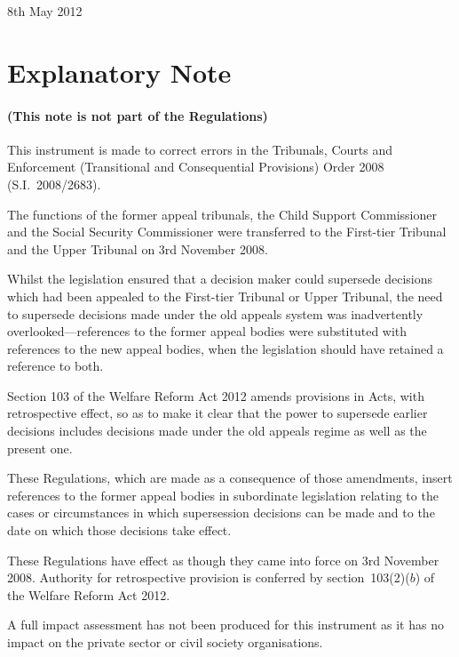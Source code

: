 \documentclass[12pt,a4paper]{article}
\begin{document}
8th May 2012

\small

\part{Explanatory Note}

\renewcommand\parthead{— Explanatory Note}

\subsection*{(This note is not part of the Regulations)}

This instrument is made to correct errors in the Tribunals, Courts and Enforcement (Transitional and Consequential Provisions) Order 2008 (S.I.~2008/2683).

The functions of the former appeal tribunals, the Child Support Commissioner and the Social Security Commissioner were transferred to the First-tier Tribunal and the Upper Tribunal on 3rd November 2008.

Whilst the legislation ensured that a decision maker could supersede decisions which had been appealed to the First-tier Tribunal or Upper Tribunal, the need to supersede decisions made under the old appeals system was inadvertently overlooked---references to the former appeal bodies were substituted with references to the new appeal bodies, when the legislation should have retained a reference to both.

Section 103 of the Welfare Reform Act 2012 amends provisions in Acts, with retrospective effect, so as to make it clear that the power to supersede earlier decisions includes decisions made under the old appeals regime as well as the present one.

These Regulations, which are made as a consequence of those amendments, insert references to the former appeal bodies in subordinate legislation relating to the cases or circumstances in which supersession decisions can be made and to the date on which those decisions take effect.

These Regulations have effect as though they came into force on 3rd November 2008. Authority for retrospective provision is conferred by section~103(2)($b$)  of the Welfare Reform Act 2012.

A full impact assessment has not been produced for this instrument as it has no impact on the private sector or civil society organisations. 
\end{document}
